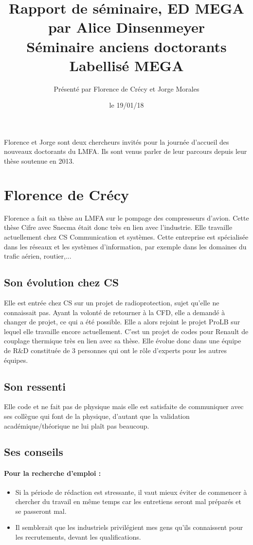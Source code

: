 \documentclass[12pt]{article}
\title{ {\fontsize{14pt}{14pt}\selectfont Rapport de séminaire, ED MEGA par Alice Dinsenmeyer} \\[1cm]
\fontsize{18pt}{18pt}\selectfont\textbf{Séminaire anciens doctorants \\ Labellisé MEGA}} %
\author{
\large{Présenté par Florence de Crécy et Jorge Morales}\\%
\vspace{-5mm}
}
\date{le 19/01/18}
\begin{document}
\maketitle
Florence et Jorge sont deux chercheurs invités pour la journée d'accueil des nouveaux doctorants du LMFA. Ils sont venus parler de leur parcours depuis leur thèse soutenue en 2013.

\section{Florence de Crécy}
Florence a fait sa thèse au LMFA sur le pompage des compresseurs d'avion. Cette thèse Cifre avec Snecma était donc très en lien avec l'industrie. Elle travaille actuellement chez CS Communication et systèmes. Cette entreprise est spécialisée dans les réseaux et les systèmes d'information, par exemple dans les domaines du trafic aérien, routier,...\\

\subsection{Son évolution chez CS}
Elle est entrée chez CS sur un projet de radioprotection, sujet qu'elle ne connaissait pas. Ayant la volonté de retourner à la CFD, elle a demandé à changer de projet, ce qui a été possible. Elle a alors rejoint le projet ProLB sur lequel elle travaille encore actuellement. C'est un projet de codes pour Renault de couplage thermique très en lien avec sa thèse. Elle évolue donc dans une équipe de R\&D constituée de 3 personnes qui ont le rôle d'experts pour les autres équipes.\\

\subsection{Son ressenti}
Elle code et ne fait pas de physique mais elle est satisfaite de communiquer avec ses collègue qui font de la physique, d'autant que la validation académique/théorique ne lui plaît pas beaucoup.

\subsection{Ses conseils}
\paragraph{Pour la recherche d'emploi : }
\begin{itemize}
	\item Si la période de rédaction est stressante, il vaut mieux éviter de commencer à chercher du travail en même temps car les entretiens seront mal préparés et se passeront mal.
	\item Il semblerait que les industriels privilégient mes gens qu'ils connaissent pour les recrutements, devant les qualifications.
\end{itemize}
\end{document}
